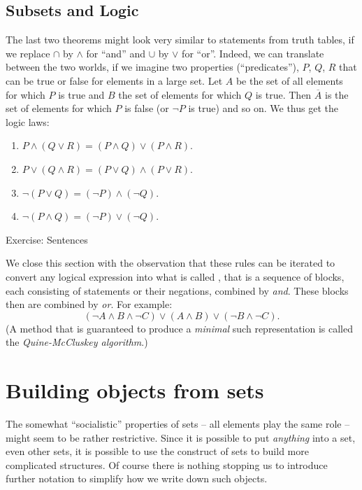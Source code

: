\subsection{Subsets and Logic}
The last two theorems might look very similar to statements from truth
tables, if we replace $\cap$ by $\wedge$ for ``and'' and $\cup$ by $\vee$
for ``or''. Indeed, we can translate between the two
worlds, if we imagine two properties (``predicates''), $P$, $Q$, $R$ that can
be true or false for elements in a large set. Let $A$ be the set of all
elements for which $P$ is true and $B$ the set of elements for which $Q$ is
true. Then $\overline{A}$ is the set of elements for which $P$ is false (or
$\lnot P$ is true) and so on. We thus get the logic laws:
\begin{enumerate}
\item $P\wedge (Q\vee R)=(P\wedge Q)\vee(P\wedge R)$. 
\item $P\vee (Q\wedge R)=(P\vee Q)\wedge(P\vee R)$. 
\item $\lnot(P\vee Q)=(\lnot P)\wedge (\lnot Q)$.
\item $\lnot(P\wedge Q)=(\lnot P)\vee (\lnot Q)$.
\end{enumerate}
Exercise: Sentences

We close this section with the observation that these rules can be iterated
to convert any logical expression into what is called , that is a sequence of blocks, each consisting of statements or
their negations, combined by {\em and}. These blocks then are combined by
{\em or}. For example:
\[
(\lnot A\wedge B\wedge\lnot C)\vee (A\wedge B)\vee (\lnot B\wedge \lnot C).
\]
(A method that is guaranteed to produce a {\em minimal} such representation
is called the {\em Quine-McCluskey algorithm}.)

\section{Building objects from sets}
\label{secmultiset}

The somewhat ``socialistic'' properties of sets -- all elements play the
same role -- might seem to be rather restrictive. Since it is possible to
put {\em anything} into a set, even other sets, it is possible to use the
construct of sets to build more complicated structures. Of course there is
nothing stopping us to introduce further notation to simplify how we write
down such objects.

